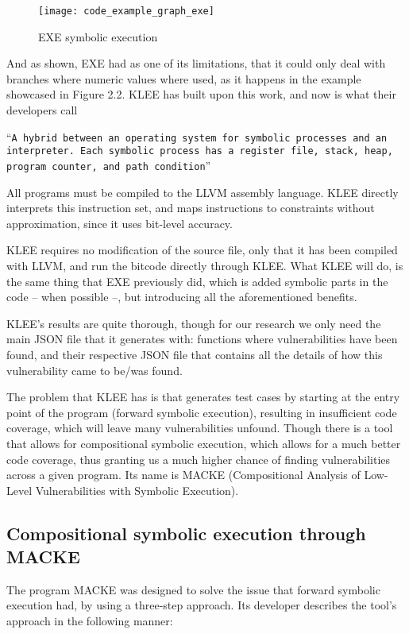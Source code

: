 \begin{figure}[!htb]
	\caption{EXE symbolic execution}
	\centering
	\texttt{[image: code\_example\_graph\_exe]}
\end{figure}

And as shown, EXE had as one of its limitations, that it could only deal with branches where numeric values where used, as it happens in the example showcased in Figure 2.2. KLEE has built upon this work, and now is what their developers call 

\enquote{\texttt{A hybrid
		between an operating system for symbolic processes and an interpreter. Each symbolic process has a register file,
		stack, heap, program counter, and path condition}} \parencite{klee}


All programs must be compiled to the LLVM  assembly language. KLEE directly interprets this instruction set, and maps instructions to constraints without approximation, since it uses bit-level accuracy.\parencite{klee}

KLEE requires no modification of the source file, only that it has been compiled with LLVM, and run the bitcode directly through KLEE. What KLEE will do, is the same thing that EXE previously did, which is added symbolic parts in the code -- when possible --, but introducing all the aforementioned benefits.

KLEE's results are quite thorough, though for our research we only need the main JSON file that it generates with: functions where vulnerabilities have been found, and their respective JSON file that contains all the details of how this vulnerability came to be/was found.

The problem that KLEE has is that generates test cases by starting at the entry point of the program (forward symbolic execution), resulting in insufficient code coverage, which will leave many vulnerabilities unfound. Though there is a tool that allows for compositional symbolic execution, which allows for a much better code coverage, thus granting us a much higher chance of finding vulnerabilities across a given program. Its name is MACKE (Compositional Analysis of Low-Level
Vulnerabilities with Symbolic Execution). \parencite{ognawala}


\subsection{Compositional symbolic execution through MACKE}

The program MACKE was designed to solve the issue that forward symbolic execution had, by using a three-step approach. Its developer describes the tool's approach in the following manner: 

